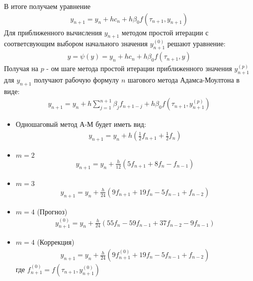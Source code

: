 В итоге  получаем уравнение
\begin{gather*}
	y_{n+1} = y_n+hc_n+h\beta_0 f(\tau_{n+1},y_{n+1})
\end{gather*}
Для приближенного вычисления $y_{n+1}$ методом простой итерации с соответсвующим выбором начального значения $y_{n+1}^{(0)}$ решают уравнение:
\begin{gather*}
	y = \psi(y) = y_n+hc_n+h\beta_0 f(\tau_{n+1},y)
\end{gather*}
Получая на $p$ - ом шаге метода простой итерации приближенного значения $y_{n+1}^{(p)}$ для $y_{n+1}$ получают рабочую формулу $n$ шагового метода Адамса-Моултона в виде:
\begin{gather*}
	y_{n+1} = y_n+h\sum_{j=1}^{n+1}\beta_j f_{n+1-j}+h\beta_0 f\left(\tau_{n+1},y_{n+1}^{(p)}\right)
\end{gather*}
\begin{itemize}
	\item Одношаговый метод А-М будет иметь вид:
		\begin{gather*}
			y_{n+1} = y_n+h\left(\frac{1}{2}f_{n+1}+\frac{1}{2}f_n\right)
		\end{gather*}
	\item $m = 2$
		\begin{gather*}
			y_{n+1} = y_n+\frac{h}{12}\left(5f_{n+1}+8f_n-f_{n-1}\right)
		\end{gather*}
	\item $m = 3$
		\begin{gather*}
			y_{n+1} = y_n+\frac{h}{24}\left(9f_{n+1}+19f_n-5f_{n-1}+f_{n-2}\right)
		\end{gather*}
	\item $m=4$ (Прогноз)
		\begin{gather*}
			y_{n+1}^{(0)} = y_n+\frac{h}{24}\left(55f_n-59f_{n-1}+37f_{n-2}-9f_{n-1}\right)
		\end{gather*}
	\item $m =4$ (Коррекция)
		\begin{gather*}
			y_{n+1} = y_n+\frac{h}{24}\left(9f_{n+1}^{(0)}+19f_n-5f_{n-1}+f_{n-2}\right)
		\end{gather*}
		где $f_{n+1}^{(0)} = f(\tau_{n+1},y_{n+1}^{(0)})$
\end{itemize}
